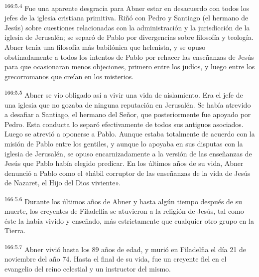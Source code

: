 \par 
\textsuperscript{166:5.4} Fue una aparente desgracia para Abner estar en desacuerdo con todos los jefes de la iglesia cristiana primitiva. Riñó con Pedro y Santiago (el hermano de Jesús) sobre cuestiones relacionadas con la administración y la jurisdicción de la iglesia de Jerusalén; se separó de Pablo por divergencias sobre filosofía y teología. Abner tenía una filosofía más babilónica que helenista, y se opuso obstinadamente a todos los intentos de Pablo por rehacer las enseñanzas de Jesús para que ocasionaran menos objeciones, primero entre los judíos, y luego entre los grecorromanos que creían en los misterios.

\par 
\textsuperscript{166:5.5} Abner se vio obligado así a vivir una vida de aislamiento. Era el jefe de una iglesia que no gozaba de ninguna reputación en Jerusalén. Se había atrevido a desafiar a Santiago, el hermano del Señor, que posteriormente fue apoyado por Pedro. Esta conducta lo separó efectivamente de todos sus antiguos asociados. Luego se atrevió a oponerse a Pablo. Aunque estaba totalmente de acuerdo con la misión de Pablo entre los gentiles, y aunque lo apoyaba en sus disputas con la iglesia de Jerusalén, se opuso encarnizadamente a la versión de las enseñanzas de Jesús que Pablo había elegido predicar. En los últimos años de su vida, Abner denunció a Pablo como el «hábil corruptor de las enseñanzas de la vida de Jesús de Nazaret, el Hijo del Dios viviente».

\par 
\textsuperscript{166:5.6} Durante los últimos años de Abner y hasta algún tiempo después de su muerte, los creyentes de Filadelfia se atuvieron a la religión de Jesús, tal como éste la había vivido y enseñado, más estrictamente que cualquier otro grupo en la Tierra.

\par 
\textsuperscript{166:5.7} Abner vivió hasta los 89 años de edad, y murió en Filadelfia el día 21 de noviembre del año 74. Hasta el final de su vida, fue un creyente fiel en el evangelio del reino celestial y un instructor del mismo.